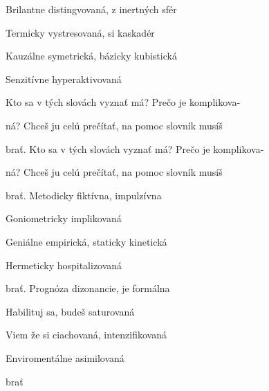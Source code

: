 \begin{song}


\large


\Large

\bigskip


 Brilantne distingvovaná, z inertných sfér \par
{} Termicky vystresovaná, si kaskadér \par
{} Kauzálne symetrická,  bázicky kubistická \par
{} Senzitívne hyperaktivovaná \par

\bigskip

\begin{chorusboxwide}{\Refren}
 Kto sa v tých slovách vyznať má? Prečo je komplikova- \par
{}ná? Chceš ju celú prečítať, na pomoc slovník musíš \par
{}brať. Kto sa v tých slovách vyznať má? Prečo je komplikova- \par
{}ná? Chceš ju celú prečítať, na pomoc slovník musíš \par
\end{chorusboxwide}

\bigskip

brať. Metodicky fiktívna, impulzívna \par
{} Goniometricky implikovaná \par
{} Geniálne empirická,  staticky kinetická \par
{} Hermeticky hospitalizovaná \par

\bigskip

\Refren

\bigskip

brať. Prognóza dizonancie, je formálna \par
{} Habilituj sa, budeš saturovaná \par
{} Viem že si ciachovaná,  intenzifikovaná \par
{} Enviromentálne asimilovaná \par

\bigskip

\Refren

\bigskip

brať

\end{song}
